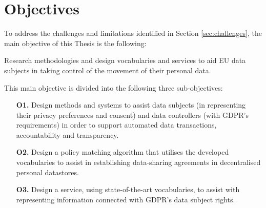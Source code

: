 \section{Objectives}
\label{sec:objectives}

To address the challenges and limitations identified in Section \ref{sec:challenges}, the main objective of this Thesis is the following:

\begin{tcolorbox}[colback=royallavender!20]
Research methodologies and design vocabularies and services to aid EU data subjects in taking control of the movement of their personal data.
\end{tcolorbox}

This main objective is divided into the following three sub-objectives:

\begin{enumerate}
    \item [\textbf{O1.}] Design methods and systems to assist data subjects (in representing their privacy preferences and consent) and data controllers (with GDPR’s requirements) in order to support automated data transactions, accountability and transparency.
    \item [\textbf{O2.}] Design a policy matching algorithm that utilises the developed vocabularies to assist in establishing data-sharing agreements in decentralised personal datastores.
    \item [\textbf{O3.}] Design a service, using state-of-the-art vocabularies, to assist with representing information connected with GDPR’s data subject rights.
\end{enumerate}
